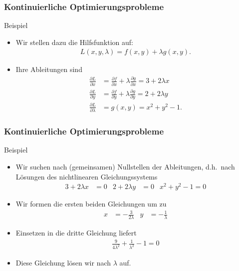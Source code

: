 \documentclass{beamer}
\renewcommand{\oe}{\"o}
\newcommand{\mytitle}{Kontinuierliche Optimierungsprobleme}
\begin{document}
\begin{frame}\frametitle{\mytitle}
	\begin{block}{Beispiel}
	\begin{itemize}
		\item Wir stellen dazu die Hilfsfunktion auf:
			\begin{align*}
				L(x,y,\lambda)=f(x,y)+\lambda g(x,y).
			\end{align*}
		\item Ihre Ableitungen sind
			\begin{align*}
				\frac{\partial L}{\partial x}&=\frac{\partial f}{\partial x}+\lambda\frac{\partial g}{\partial x}=3+2\lambda x\\
				\frac{\partial L}{\partial y}&=\frac{\partial f}{\partial y}+\lambda\frac{\partial g}{\partial y}=2+2\lambda y\\
				\frac{\partial L}{\partial \lambda}&=g(x,y)=x^2+y^2-1.
			\end{align*}
	\end{itemize}
	\end{block}
\end{frame}

\begin{frame}\frametitle{\mytitle}
	\begin{block}{Beispiel}
	\begin{itemize}
		\item Wir suchen nach (gemeinsamen) Nullstellen der Ableitungen, d.h.\ nach L\oe sungen des nichtlinearen Gleichungssystems
			\begin{align*}
				3+2\lambda x&=0&2+2\lambda y&=0&x^2+y^2-1=0
			\end{align*}
		\item Wir formen die ersten beiden Gleichungen um zu
			\begin{align*}
				x&=-\frac{3}{2\lambda}&y&=-\frac{1}{\lambda}
			\end{align*}
		\item Einsetzen in die dritte Gleichung liefert
			\begin{align*}
			\frac{9}{4\lambda^2}+\frac{1}{\lambda^2}-1=0
			\end{align*}
		\item Diese Gleichung l\oe sen wir nach $\lambda$ auf.
	\end{itemize}
	\end{block}
\end{frame}
\end{document}
